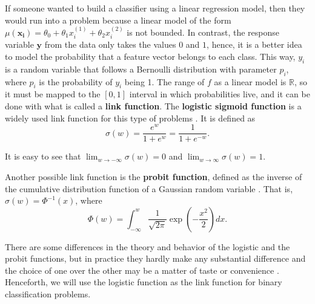 If someone wanted to build a classifier using a linear regression model, then they would run into a problem because a linear model of the form $\mu(\boldsymbol{x_i}) = \theta_0 + \theta_1 x_i^{(1)} + \theta_2 x_i^{(2)}$ is not bounded. In contrast, the response variable $\boldsymbol{y}$ from the data only takes the values $0$ and $1$, hence, it is a better idea to model the probability that a feature vector belongs to each class. This way, $y_i$ is a random variable that follows a Bernoulli distribution with parameter $p_i$, where $p_i$ is the probability of $y_i$ being 1.
The range of $f$ as a linear model is $\mathbb{R}$, so it must be mapped to the $\left[ 0,1 \right]$ interval in which probabilities live, and it can be done with what is called a \textbf{link function}. The \textbf{logistic sigmoid function} %
is a widely used link function for this type of problems \cite[p.~114]{christopher2006pattern}. It is defined as
\begin{equation}
  \sigma(w) = \frac{e^w}{1 + e^w} = \frac{1}{1 + e^{-w}}.
\end{equation}

It is easy to see that $\lim_{w \to -\infty} \sigma(w) = 0$ and $\lim_{w \to \infty} \sigma(w) = 1$.


Another possible link function is the \textbf{probit function}, defined as the inverse of the cumulative distribution function of a Gaussian random variable \cite[p.~296]{friedman2001elements}. That is, $\sigma(w) = \Phi^{-1}\left( x \right)$,
where
\begin{equation}
  \Phi(w) = \int_{-\infty}^w \frac{1}{\sqrt{2 \pi}} \exp{\left( -\frac{x^2}{2} \right)} dx.
\end{equation}

There are some differences in the theory and behavior of the logistic and the probit functions, but in practice they hardly make any substantial difference and the choice of one over the other may be a matter of taste or convenience \cite[p.~118]{gelman2006data}. Henceforth, we will use the logistic function as the link function for binary classification problems.

